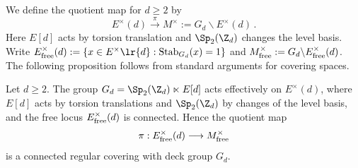 \documentclass[a4paper, aps, pra, 11pt, onecolumn, tightenlines, superscriptaddress]{revtex4-2}
\begin{document}
We define the quotient map for $d\geq 2$ by 
\begin{equation}
    E^{\times}(d) \xrightarrow{\pi} M^{\times}:=G_d\backslash E^{\times}(d)\,.
    \label{eq:EMspace}
\end{equation}
%
Here $E[d]$ acts by torsion translation and $\Sp_2(\Z_d)$ changes the level basis. Write $E^{\times}_{\rm free}(d):=\{x\in E^{\times}\lr{d}:\operatorname{Stab}_{G_d}(x)=1\}$ and $M^{\times}_{\rm free}:=G_d\backslash E^{\times}_{\rm free}(d)$. The following proposition follows from standard arguments for covering spaces.

\begin{prop}\label{prop:monodromy}
Let $d\geq 2$. The group $G_d=\Sp_2(\Z_d)\ltimes E[d]$ acts effectively on $E^{\times}(d)$,
where $E[d]$ acts by torsion translations and $\Sp_2(\Z_d)$ by changes of the level basis,
and the free locus $E^{\times}_{\rm free}(d)$ is connected. Hence the quotient map
\begin{equation}
\pi:E^{\times}_{\rm free}(d)\longrightarrow M^{\times}_{\rm free}
\end{equation}
is a connected regular covering with deck group $G_d$.
\end{prop}
\end{document}
